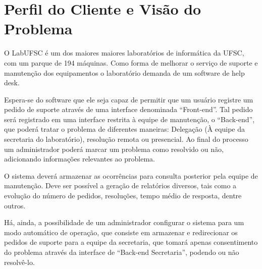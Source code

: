 \documentclass[brazil,times]{abnt}
\begin{document}






\capa

\folhaderosto

\tableofcontents

\chapter{Perfil do Cliente e Visão do Problema}
O LabUFSC é um dos maiores maiores laboratórios de informática da UFSC, com um
parque de 194 máquinas. Como forma de melhorar o serviço de 
suporte e manutenção dos equipamentos o laboratório demanda de um software de
help desk.

Espera-se do software que ele seja capaz de permitir que um usuário registre um
pedido de suporte através de uma interface denominada “Front-end”. Tal pedido
será registrado em uma interface restrita à equipe de manutenção, o “Back-end”,
que poderá tratar o problema de diferentes maneiras: Delegação (À equipe da
secretaria do laboratório), resolução remota ou presencial. Ao final do
processo um administrador poderá marcar um problema como resolvido ou não,
adicionando informações relevantes ao problema.

O sistema deverá armazenar as ocorrências para consulta posterior pela equipe
de manutenção. Deve ser possível a geração de relatórios diversos, tais como a
evolução do número de pedidos, resoluções, tempo médio de resposta, dentre
outros.

Há, ainda, a possibilidade de um administrador configurar o sistema para um
modo automático de operação, que consiste em armazenar e redirecionar os
pedidos de suporte para a equipe da secretaria, que tomará apenas consentimento
do problema através da interface de “Back-end Secretaria”, podendo ou não resolvê-lo.
\end{document}
